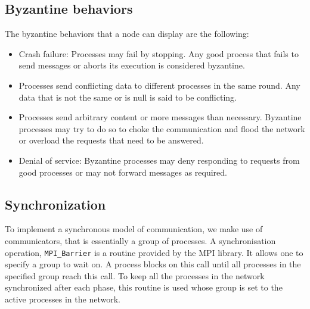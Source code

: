 \subsection{Byzantine behaviors}
The byzantine behaviors that a node can display are the following:
\begin{itemize}
    \item Crash failure: Processes may fail by stopping. Any good process that fails to send messages or aborts its execution is considered byzantine.
    \item Processes send conflicting data to different processes in the same round. Any data that is not the same or is null is said to be conflicting.
    \item Processes send arbitrary content or more messages than necessary. Byzantine processes may try to do so to choke the communication and flood the network or overload the requests that need to be answered.
    \item Denial of service: Byzantine processes may deny responding to requests from good processes or may not forward messages as required. 
\end{itemize}

\subsection{Synchronization}
To implement a synchronous model of communication, we make use of communicators, that is essentially a group of processes. A synchronisation operation, \texttt{MPI\_Barrier} is a routine provided by the MPI library. It allows one to specify a group to wait on. A process blocks on this call until all processes in the specified group reach this call. To keep all the processes in the network synchronized after each phase, this routine is used whose group is set to the active processes in the network.



